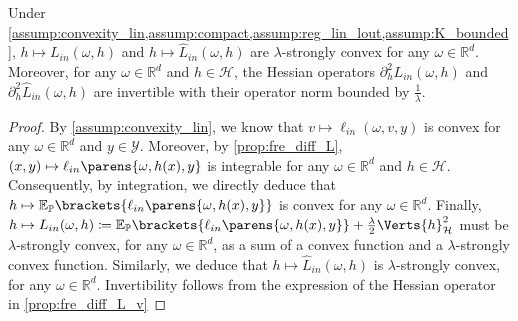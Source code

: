 \begin{proposition}\label{prop:strong_convexity_Lin}
Under \cref{assump:convexity_lin,assump:compact,assump:reg_lin_lout,assump:K_bounded}, $h\mapsto L_{in}(\omega, h)$ and $h\mapsto \widehat{L}_{in}(\omega, h)$ are $\lambda$-strongly convex for any $\omega\in{\mathbb{R}^d}$. Moreover, {for any $\omega\in\mathbb{R}^d$ and $h\in\mathcal{H}$,} the Hessian operators $\partial_{h}^2 L_{in}(\omega, h)$ and $\partial_{h}^2 \widehat{L}_{in}(\omega, h)$ are invertible with their operator norm bounded by $\frac{1}{\lambda}$.
\end{proposition}
\begin{proof}
{By \cref{assump:convexity_lin}}, we know that $v\mapsto \ell_{in}(\omega, v, y)$ is convex {for any $\omega\in\mathbb{R}^d$ and $y\in\mathcal{Y}$}. Moreover, by \cref{prop:fre_diff_L}, $(x,y)\mapsto \ell_{in}\parens{\omega, h(x),y}$ is integrable for any {$\omega\in\mathbb{R}^d$ and $h\in \mathcal{H}$}. 
Consequently, by integration, we directly deduce that $h\mapsto \mathbb{E}_{\mathbb{P}}\brackets{\ell_{in}\parens{\omega, h(x),y}}$ is convex for any $\omega\in {\mathbb{R}^d}$. Finally, $h \mapsto L_{in}(\omega, h) \coloneqq  \mathbb{E}_{\mathbb{P}}\brackets{\ell_{in}\parens{\omega, h(x),y}} + \frac{\lambda}{2} \Verts{h}_{\mathcal{H}}^2 $ must be $\lambda$-strongly convex{, for any $\omega\in\mathbb{R}^d$}, as a sum of a convex function and a $\lambda$-strongly convex function. Similarly, we deduce that $h\mapsto \widehat{L}_{in}(\omega,h)$ is $\lambda$-strongly convex{, for any $\omega\in\mathbb{R}^d$}. Invertibility follows from the expression of the Hessian operator in \cref{prop:fre_diff_L_v}  
\end{proof}



